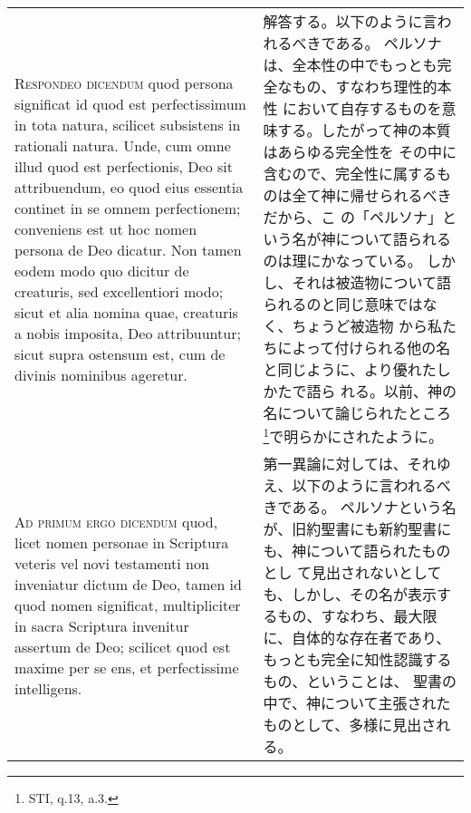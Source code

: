 \documentclass[10pt]{jsarticle} %
\begin{document}
\begin{longtable}{p{21em}p{21em}}
\\



{\scshape Respondeo dicendum} quod persona significat id quod est
perfectissimum in tota natura, scilicet subsistens in rationali
natura. Unde, cum omne illud quod est perfectionis, Deo sit
attribuendum, eo quod eius essentia continet in se omnem perfectionem;
conveniens est ut hoc nomen persona de Deo dicatur. Non tamen eodem modo
quo dicitur de creaturis, sed excellentiori modo; sicut et alia nomina
quae, creaturis a nobis imposita, Deo attribuuntur; sicut supra ostensum
est, cum de divinis nominibus ageretur.


&

解答する。以下のように言われるべきである。
ペルソナは、全本性の中でもっとも完全なもの、すなわち理性的本性
 において自存するものを意味する。したがって神の本質はあらゆる完全性を
 その中に含むので、完全性に属するものは全て神に帰せられるべきだから、こ
 の「ペルソナ」という名が神について語られるのは理にかなっている。
しかし、それは被造物について語られるのと同じ意味ではなく、ちょうど被造物
 から私たちによって付けられる他の名と同じように、より優れたしかたで語ら
 れる。以前、神の名について論じられたところ\footnote{STI,
 q.13, a.3.}で明らかにされたように。


%
%
%
%




\\



{\scshape Ad primum ergo dicendum} quod, licet nomen personae in Scriptura veteris
vel novi testamenti non inveniatur dictum de Deo, tamen id quod nomen
significat, multipliciter in sacra Scriptura invenitur assertum de Deo;
scilicet quod est maxime per se ens, et perfectissime intelligens. 

&

第一異論に対しては、それゆえ、以下のように言われるべきである。
ペルソナという名が、旧約聖書にも新約聖書にも、神について語られたものとし
 て見出されないとしても、しかし、その名が表示するもの、すなわち、最大限
 に、自体的な存在者であり、もっとも完全に知性認識するもの、ということは、
 聖書の中で、神について主張されたものとして、多様に見出される。


\end{longtable}
\end{document}
